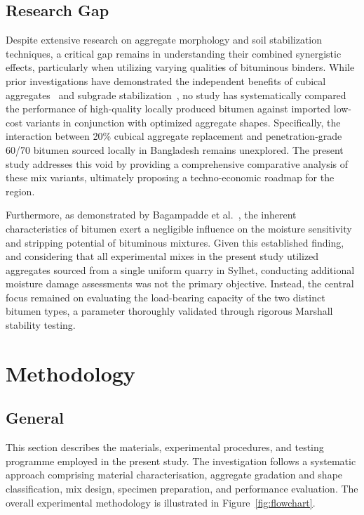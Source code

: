 \documentclass[12pt,a4paper]{article}
\begin{document}
\subsection{Research Gap}
Despite extensive research on aggregate morphology and soil stabilization techniques, a critical gap remains in understanding their combined synergistic effects, particularly when utilizing varying qualities of bituminous binders. While prior investigations have demonstrated the independent benefits of cubical aggregates~\cite{teja2020effect, sumanth2017study} and subgrade stabilization~\cite{sood2015evaluation}, no study has systematically compared the performance of high-quality locally produced bitumen against imported low-cost variants in conjunction with optimized aggregate shapes. Specifically, the interaction between 20\% cubical aggregate replacement and penetration-grade 60/70 bitumen sourced locally in Bangladesh remains unexplored. The present study addresses this void by providing a comprehensive comparative analysis of these mix variants, ultimately proposing a techno-economic roadmap for the region.

Furthermore, as demonstrated by Bagampadde et al.~\cite{bagampadde2006impact}, the inherent characteristics of bitumen exert a negligible influence on the moisture sensitivity and stripping potential of bituminous mixtures. Given this established finding, and considering that all experimental mixes in the present study utilized aggregates sourced from a single uniform quarry in Sylhet, conducting additional moisture damage assessments was not the primary objective. Instead, the central focus remained on evaluating the load-bearing capacity of the two distinct bitumen types, a parameter thoroughly validated through rigorous Marshall stability testing.

\section{Methodology}

\subsection{General}

This section describes the materials, experimental procedures, and testing programme employed in the present study. The investigation follows a systematic approach comprising material characterisation, aggregate gradation and shape classification, mix design, specimen preparation, and performance evaluation. The overall experimental methodology is illustrated in Figure~\ref{fig:flowchart}.
\end{document}
